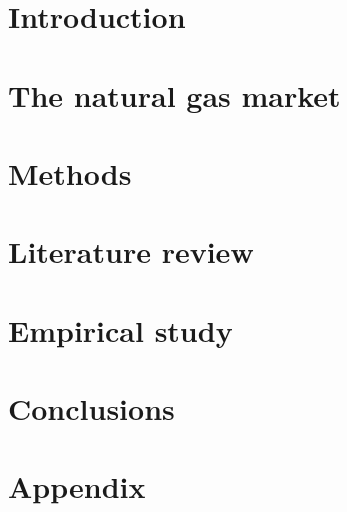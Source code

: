 
\part{Introduction}

%
\part{The natural gas market}


\part{Methods}


\part{Literature review}


\part{Empirical study}




\part{Conclusions}





\part{Appendix}
\newpage


\newpage



